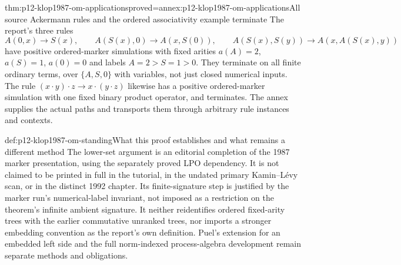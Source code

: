 \begin{hbtheorem}{thm:p12-klop1987-om-applications}{proved=annex:p12-klop1987-om-applications}{All source Ackermann rules and the ordered associativity example terminate}
The report's three rules
\[
 A(0,x)\to S(x),\qquad A(S(x),0)\to A(x,S(0)),\qquad
 A(S(x),S(y))\to A(x,A(S(x),y))
\]
have positive ordered-marker simulations with fixed arities
\(a(A)=2\), \(a(S)=1\), \(a(0)=0\) and labels
\(A=2>S=1>0\). They terminate on all finite ordinary terms,
over \(\{A,S,0\}\) with variables, not just closed numerical
inputs. The rule
\((x\mathbin{\cdot}y)\mathbin{\cdot}z\to
x\mathbin{\cdot}(y\mathbin{\cdot}z)\) likewise has a positive
ordered-marker simulation with one fixed binary product operator,
and terminates. The annex supplies the actual paths and transports
them through arbitrary rule instances and contexts.
\end{hbtheorem}

\begin{proofboundary}{def:p12-klop1987-om-standing}{What this proof establishes and what remains a different method}
The lower-set argument is an editorial completion of the 1987 marker
presentation, using the separately proved LPO dependency. It is not
claimed to be printed in full in the tutorial, in the undated primary
Kamin--L\'evy scan, or in the distinct 1992 chapter. Its finite-signature
step is justified by the marker run's numerical-label invariant, not
imposed as a restriction on the theorem's infinite ambient signature.
It neither reidentifies ordered fixed-arity trees with the earlier
commutative unranked trees, nor imports a stronger embedding convention
as the report's own definition. Puel's extension for an embedded left
side and the full norm-indexed process-algebra development remain
separate methods and obligations.
\end{proofboundary}
